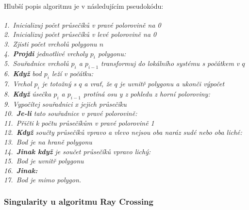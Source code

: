 \documentclass{article}
\begin{document}
\vspace{0.2cm}\\
Hlubší popis algoritmu je v následujícím pseudokódu:\\
\vspace{0.2cm}\\
\indent\textit{\textrm{1.~}Inicializuj počet průsečíků v pravé polorovině na 0}\\
\indent\textit{\textrm{2.~}Inicializuj počet průsečíků v levé polorovině na 0}\\
\indent\textit{\textrm{3.~}Zjisti počet vrcholů polygonu $n$}\\
\indent\textit{\textrm{4.~}\textbf{Projdi} jednotlivé vrcholy $p_{i}$ polygonu:}\\
\indent\indent\textit{\textrm{5.~}Souřadnice vrcholů $p_{i}$ a $p_{i-1}$ transformuj do lokálního systému s počátkem v $q$}\\
\indent\indent\textit{\textrm{6.~}\textbf{Když} bod $p_{i}$ leží v počátku:}\\
\indent\indent\indent\textit{\textrm{7.~}Vrchol $p_{i}$ je totožný s $q$ a vrať, že $q$ je uvnitř polygonu a ukonči výpočet}\\
\indent\indent\textit{\textrm{8.~}\textbf{Když} úsečka $p_{i}$ a $p_{i-1}$ protíná osu y z pohledu z horní poloroviny:}\\
\indent\indent\indent\textit{\textrm{9.~}Vypočítej souřadnici x jejich průsečíku}\\
\indent\indent\indent\textit{\textrm{10.~}\textbf{Je-li} tato souřadnice v pravé polorovině:}\\
\indent\indent\indent\indent\textit{\textrm{11.~}Přičti k počtu průsečíkům v pravé polorovině 1}\\
\indent\textit{\textrm{12.~}\textbf{Když} součty průsečíků vpravo a vlevo nejsou oba naráz sudé nebo oba liché:}\\
\indent\indent\textit{\textrm{13.~}Bod je na hraně polygonu}\\
\indent\textit{\textrm{14.~}\textbf{Jinak když} je součet průsečíků vpravo lichý:}\\
\indent\indent\textit{\textrm{15.~}Bod je uvnitř polygonu}\\
\indent\textit{\textrm{16.~}\textbf{Jinak:}}\\
\indent\indent\textit{\textrm{17.~}Bod je mimo polygon.}
\subsubsection{\small{Singularity u algoritmu Ray Crossing}}
\end{document}
